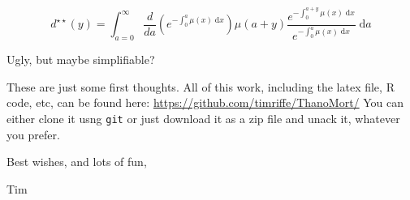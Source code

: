 \documentclass{article}
\newcommand{\dd}{\; \mathrm{d}}
\begin{document}
\begin{equation}
\label{eq:dymu}
d^{\star\star}(y) = \int _{a=0}^\infty
\frac{d}{da}\left(e^{-\int_{0}^{a}\mu(x)\dd
x}\right)\mu(a+y)\frac{e^{-\int_{0}^{a+y}\mu(x)\dd x}}{e^{-\int_{0}^{a}\mu(x)\dd
x}}\dd a
\end{equation}

Ugly, but maybe simplifiable? 

These are just some first thoughts. All of this work, including the latex file,
R code, etc, can be found here: \url{https://github.com/timriffe/ThanoMort/}
You can either clone it usng \texttt{git} or just download it as a zip file and
unack it, whatever you prefer.

Best wishes, and lots of fun,

Tim
\end{document}
